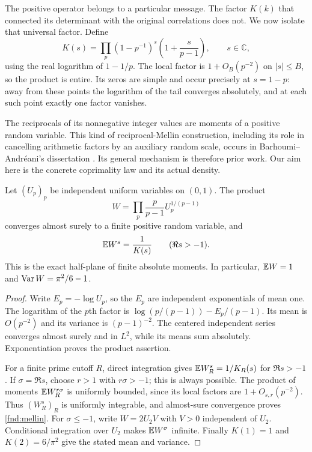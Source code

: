 The positive operator belongs to a particular message.  The factor
$K(k)$ that connected its determinant with the original correlations
does not.  We now isolate that universal factor.  Define
\begin{equation}
 K(s)=\prod_p(1-p^{-1})^s\left(1+\frac{s}{p-1}\right),
 \qquad s\in\mathbb C,
 \label{fnd:entire-k}
\end{equation}
using the real logarithm of $1-1/p$.  The local factor is
$1+O_B(p^{-2})$ on $|s|\le B$, so the product is entire.
Its zeros are simple and occur precisely at $s=1-p$:
away from these points the logarithm of the tail converges
absolutely, and at each such point exactly one factor vanishes.

The reciprocals of its nonnegative integer values are moments of a
positive random variable.  This kind of reciprocal-Mellin construction,
including its role in cancelling arithmetic factors by an auxiliary
random scale, occurs in Barhoumi--Andr\'eani's dissertation
\cite[Section 3.6.1]{fndBarhoumi2013}.  Its general mechanism is
therefore prior work.  Our aim here is the concrete coprimality law
and its actual density.

\begin{proposition}\label{fnd:prime-noise}
Let $(U_p)_p$ be independent uniform variables on $(0,1)$.  The product
\begin{equation}
 W=\prod_p\frac p{p-1}U_p^{1/(p-1)}
 \label{fnd:w-product}
\end{equation}
converges almost surely to a finite positive random variable, and
\begin{equation}
 \mathbb E W^s=\frac1{K(s)}\qquad(\Re s>-1).
 \label{fnd:mellin}
\end{equation}
This is the exact half-plane of finite absolute moments.  In particular,
$\mathbb E W=1$ and $\operatorname{Var} W=\pi^2/6-1$.
\end{proposition}
\begin{proof}
Write $E_p=-\log U_p$, so the $E_p$ are independent exponentials
of mean one.  The logarithm of the $p$th factor is
$\log(p/(p-1))-E_p/(p-1)$.  Its mean is $O(p^{-2})$
and its variance is $(p-1)^{-2}$.  The centered independent series
converges almost surely and in $L^2$, while its means sum absolutely.
Exponentiation proves the product assertion.

For a finite prime cutoff $R$, direct integration gives
$\mathbb E W_R^s=1/K_R(s)$ for $\Re s>-1$.  If $\sigma=\Re s$,
choose $r>1$ with $r\sigma>-1$; this is always possible.
The product of moments $\mathbb E W_R^{r\sigma}$ is uniformly bounded,
since its local factors are $1+O_{s,r}(p^{-2})$.
Thus $(W_R^s)_R$ is uniformly integrable, and almost-sure
convergence proves \eqref{fnd:mellin}.
For $\sigma\le-1$, write $W=2U_2V$ with $V>0$ independent
of $U_2$.  Conditional integration over $U_2$ makes
$\mathbb E W^\sigma$ infinite.  Finally $K(1)=1$ and
$K(2)=6/\pi^2$ give the stated mean and variance.
\end{proof}

